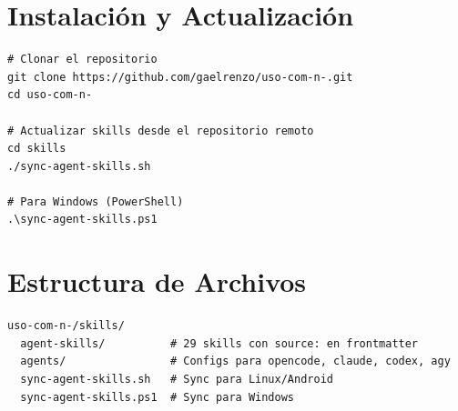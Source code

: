 ﻿\documentclass[11pt,a4paper]{article}
\begin{document}
\section{Instalación y Actualización}

\begin{verbatim}
# Clonar el repositorio
git clone https://github.com/gaelrenzo/uso-com-n-.git
cd uso-com-n-

# Actualizar skills desde el repositorio remoto
cd skills
./sync-agent-skills.sh

# Para Windows (PowerShell)
.\sync-agent-skills.ps1
\end{verbatim}

\section{Estructura de Archivos}

\begin{verbatim}
uso-com-n-/skills/
  agent-skills/          # 29 skills con source: en frontmatter
  agents/                # Configs para opencode, claude, codex, agy
  sync-agent-skills.sh   # Sync para Linux/Android
  sync-agent-skills.ps1  # Sync para Windows
\end{verbatim}
\end{document}

